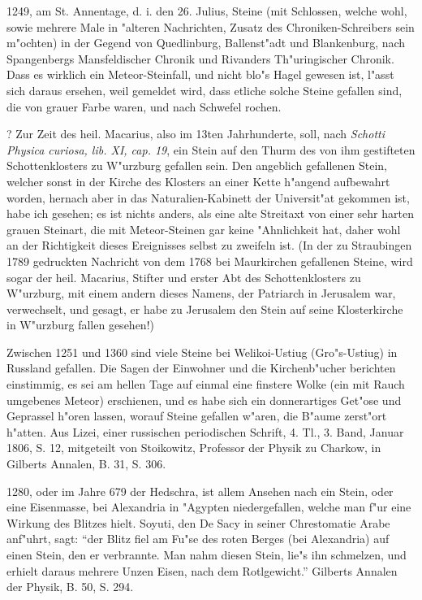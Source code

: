 \documentclass[a4paper, 11pt, oneside, polutonikogreek, german]{article}
\begin{document}
1249, am St. Annentage, d. i. den 26. Julius, Steine (mit Schlossen, welche wohl, sowie mehrere Male in "alteren Nachrichten, Zusatz des Chroniken-Schreibers sein m"ochten) in der Gegend von Quedlinburg, Ballenst"adt und Blankenburg, nach Spangenbergs Mansfeldischer Chronik und Rivanders Th"uringischer Chronik. Dass es wirklich ein Meteor-Steinfall, und nicht blo"s Hagel gewesen ist, l"asst sich daraus ersehen, weil gemeldet wird, dass etliche solche Steine gefallen sind, die von grauer Farbe waren, und nach Schwefel rochen.

? Zur Zeit des heil. Macarius, also im 13ten Jahrhunderte, soll, nach \emph{Schotti Physica curiosa, lib. XI, cap. 19}, ein Stein auf den Thurm des von ihm gestifteten Schottenklosters zu W"urzburg gefallen sein. Den angeblich gefallenen Stein, welcher sonst in der Kirche des Klosters an einer Kette h"angend aufbewahrt worden, hernach aber in das Naturalien-Kabinett der Universit"at gekommen ist, habe ich gesehen; es ist nichts anders, als eine alte Streitaxt von einer sehr harten grauen Steinart, die mit Meteor-Steinen gar keine "Ahnlichkeit hat, daher wohl an der Richtigkeit dieses Ereignisses selbst zu zweifeln ist. (In der zu Straubingen 1789 gedruckten Nachricht von dem 1768 bei Maurkirchen gefallenen Steine, wird sogar der heil. Macarius, Stifter und erster Abt des Schottenklosters zu W"urzburg, mit einem andern dieses Namens, der Patriarch in Jerusalem war, verwechselt, und gesagt, er habe zu Jerusalem den Stein auf seine Klosterkirche in W"urzburg fallen gesehen!)

Zwischen 1251 und 1360 sind viele Steine bei Welikoi-Ustiug (Gro"s-Ustiug) in Russland gefallen. Die Sagen der Einwohner und die Kirchenb"ucher berichten einstimmig, es sei am hellen Tage auf einmal eine finstere Wolke (ein mit Rauch umgebenes Meteor) erschienen, und es habe sich ein donnerartiges Get"ose und Geprassel h"oren lassen, worauf Steine gefallen w"aren, die B"aume zerst"ort h"atten. Aus Lizei, einer russischen periodischen Schrift, 4. Tl., 3. Band, Januar 1806, S. 12, mitgeteilt von Stoikowitz, Professor der Physik zu Charkow, in Gilberts Annalen, B. 31, S. 306.

1280, oder im Jahre 679 der Hedschra, ist allem Ansehen nach ein Stein, oder eine Eisenmasse, bei Alexandria in "Agypten niedergefallen, welche man f"ur eine Wirkung des Blitzes hielt. Soyuti, den De Sacy in seiner Chrestomatie Arabe anf"uhrt, sagt: "`der Blitz fiel am Fu"se des roten Berges (bei Alexandria) auf einen Stein, den er verbrannte. Man nahm diesen Stein, lie"s ihn schmelzen, und erhielt daraus mehrere Unzen Eisen, nach dem Rotlgewicht."' Gilberts Annalen der Physik, B. 50, S. 294.
\end{document}
